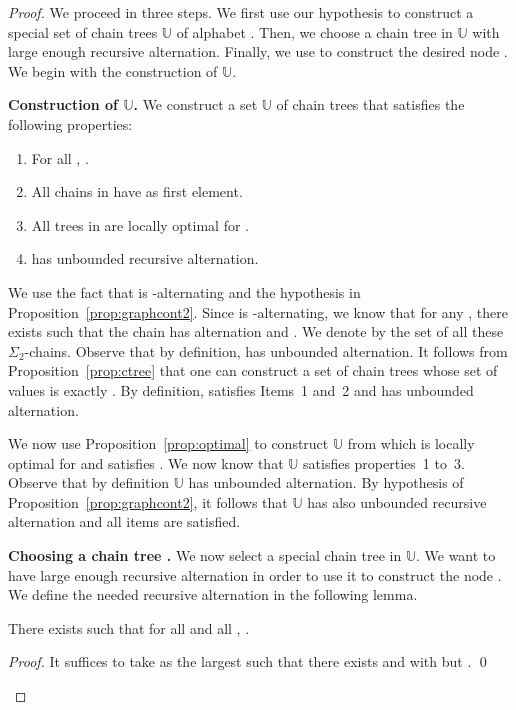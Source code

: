 \documentclass[envcountsame]{llncs}
\newcommand\crr{\ensuremath{\mathbb{U}}\xspace}
\newcommand{\sic}[1]{\ensuremath{\Sigma_{#1}}\xspace}
\newcommand\chain{chain\xspace}
\newcommand\chains{chains\xspace}
\newcommand\qchains[1]{\ensuremath{\sic{#1}}-chains\xspace}
\newcommand\dchains{\qchains{2}}
\begin{document}
\begin{proof} We proceed in three steps. We first use our hypothesis
  to construct a special set of \chain trees \crr of alphabet .
  Then, we choose a \chain tree  in \crr with large enough recursive
  alternation. Finally, we use  to construct the desired node
  . We begin with the construction of \crr.

  \medskip
  \noindent
  {\bf Construction of \crr.} We construct a set \crr of \chain trees
  that satisfies the following properties: 
  \begin{enumerate}
  \item For all , .
  \item All \chains in  have  as first
    element.
  \item All trees in  are locally optimal for .
  \item  has unbounded recursive alternation.
  \end{enumerate}
  We use the fact that  is -alternating and the
  hypothesis in Proposition~\ref{prop:graphcont2}. Since  is
  -alternating, we know that for any , there exists
   such that the \chain
   has alternation  and . We 
  denote by  the set of all these
  \dchains. Observe that by definition,  has unbounded
  alternation. It follows from Proposition~\ref{prop:ctree} that one 
  can construct a set of \chain trees  whose set of values
  is exactly . By definition,  satisfies Items~1 and~2 and
   has unbounded alternation.

  We now use Proposition~\ref{prop:optimal} to construct \crr from
   which is locally optimal for  and satisfies . We now know that
  \crr satisfies properties~1 to~3. Observe that by definition \crr has
  unbounded alternation. By hypothesis of
  Proposition~\ref{prop:graphcont2}, it follows that \crr has also 
  unbounded recursive alternation and all items are satisfied.

  \medskip
  \noindent
  {\bf Choosing a \chain tree .} We now select a special
  \chain tree  in \crr. We want  to have large enough recursive
  alternation in order to use it to construct the node 
  . We define the needed recursive alternation in the
  following lemma.

  \begin{lemma} \label{lem:chooseK}
    There exists  such that for all  and all , .
  \end{lemma}

  \begin{proof}
    It suffices to take  as the largest  such that there exists
     and  with  but . \qed
  \end{proof}


\end{proof}
\end{document}
